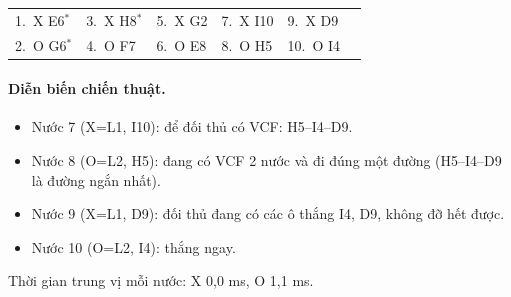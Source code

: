 {\footnotesize\linespread{1}\selectfont
\noindent\begin{tabularx}{\linewidth}{*{6}{X}}
\toprule
1.~X E6$^\ast$ & 3.~X H8$^\ast$ & 5.~X G2 & 7.~X I10 & 9.~X D9 &  \\
2.~O G6$^\ast$ & 4.~O F7 & 6.~O E8 & 8.~O H5 & 10.~O I4 &  \\
\bottomrule
\end{tabularx}\par}
\paragraph{Diễn biến chiến thuật.}
\begin{itemize}\small
\setlength{\itemsep}{0pt}
  \item Nước 7 (X=L1, I10): để đối thủ có VCF: H5--I4--D9.
  \item Nước 8 (O=L2, H5): đang có VCF 2 nước và đi đúng một đường (H5--I4--D9 là đường ngắn nhất).
  \item Nước 9 (X=L1, D9): đối thủ đang có các ô thắng I4, D9, không đỡ hết được.
  \item Nước 10 (O=L2, I4): thắng ngay.
\end{itemize}
Thời gian trung vị mỗi nước: X 0,0 ms, O 1,1 ms.
\clearpage

